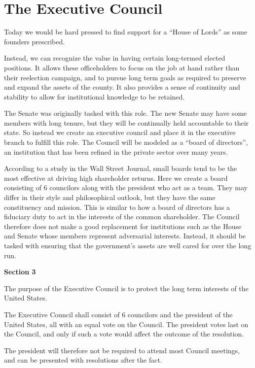 \documentclass{article}
\newcommand{\quotes}[1]{``#1''}
\begin{document}
\section{The Executive Council}

Today we would be hard pressed to find support for a \quotes{House of Lords} as some founders prescribed.

Instead, we can recognize the value in having certain long-termed elected positions. It allows these officeholders to focus on the job at hand rather than their reelection campaign, and to pursue long term goals as required to preserve and expand the assets of the county. It also provides a sense of continuity and stability to allow for institutional knowledge to be retained.

The Senate was originally tasked with this role. The new Senate may have some members with long tenure, but they will be continually held accountable to their state. So instead we create an executive council and place it in the executive branch to fulfill this role. The Council will be modeled as a \quotes{board of directors}, an institution that has been refined in the private sector over many years.

According to a study in the Wall Street Journal, small boards tend to be the most effective at driving high shareholder returns\cite{Lublin}. Here we create a board consisting of 6 councilors along with the president who act as a team. They may differ in their style and philosophical outlook, but they have the same constituency and mission. This is similar to how a board of directors has a fiduciary duty to act in the interests of the common shareholder. The Council therefore does not make a good replacement for institutions such as the House and Senate whose members represent adversarial interests. Instead, it should be tasked with ensuring that the government's assets are well cared for over the long run.

\begin{quoting}
\textbf{Section 3}

The purpose of the Executive Council is to protect the long term interests of the United States.

The Executive Council shall consist of 6 councilors and the president of the United States, all with an equal vote on the Council. The president votes last on the Council, and only if such a vote would affect the outcome of the resolution.
\end{quoting}

The president will therefore not be required to attend most Council meetings, and can be presented with resolutions after the fact.
\end{document}
